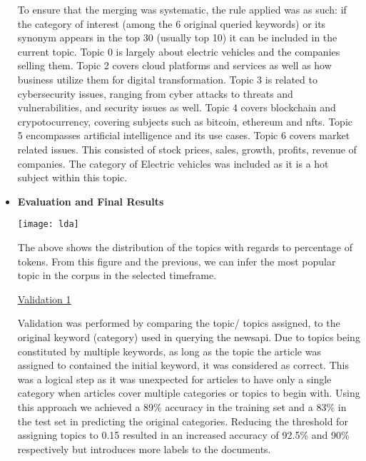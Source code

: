 \documentclass{article}
\begin{document}
\begin{titlepage}
\begin{itemize}
			\quad To ensure that the merging was systematic, the rule applied was as such: if the category of interest (among the 6 original queried keywords) or its synonym appears in the top 30 (usually top 10) it can be included in the current topic. Topic 0 is largely about electric vehicles and the companies selling them. Topic 2 covers cloud platforms and services as well as how business utilize them for digital transformation. Topic 3 is related to cybersecurity issues, ranging from cyber attacks to threats and vulnerabilities, and security issues as well. Topic 4 covers blockchain and crypotocurrency, covering subjects such as bitcoin, ethereum and nfts. Topic 5 encompasses artificial intelligence and its use cases. Topic 6 covers market related issues. This consisted of stock prices, sales, growth, profits, revenue of companies. The category of Electric vehicles was included as it is a hot subject within this topic.
            
		
			
            \pagebreak
            
            \item[] \textbf{Evaluation and Final Results}
            
\begin{center}
\texttt{[image: lda]}
\end{center}             
        

            
            
            
            

            \quad The above shows the distribution of the topics with regards to percentage of tokens. From this figure and the previous, we can infer the most popular topic in the corpus in the selected timeframe.
            
\quad

\underline{Validation 1} 

            \quad Validation was performed by comparing the topic/ topics assigned, to the original keyword (category) used in querying the newsapi. Due to topics being constituted by multiple keywords, as long as the topic the article was assigned to contained the initial keyword, it was considered as correct. This was a logical step as it was unexpected for articles to have only a single category when articles cover multiple categories or topics to begin with. Using this approach we achieved a 89\% accuracy in the training set and a 83\% in the test set in predicting the original categories. Reducing the threshold for assigning topics to 0.15 resulted in an increased accuracy of 92.5\% and 90\% respectively but introduces more labels to the documents.


\end{itemize}
\end{titlepage}
\end{document}

